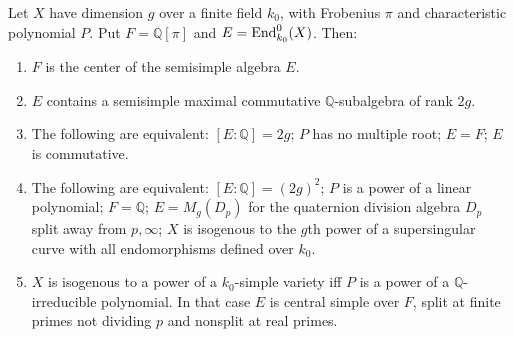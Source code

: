 \begin{theorem}
\label{mumford-thm-endomorphism-algebra-finite-field}
Let $X$ have dimension $g$ over a finite field $k_0$, with Frobenius $\pi$ and
characteristic polynomial $P$. Put $F=\mathbb Q[\pi]$ and
$E={\rm End}_{k_0}^{0}(X)$. Then:
\begin{enumerate}
\item $F$ is the center of the semisimple algebra $E$.
\item $E$ contains a semisimple maximal commutative $\mathbb Q$-subalgebra
of rank $2g$.
\item The following are equivalent: $[E:\mathbb Q]=2g$; $P$ has no multiple
root; $E=F$; $E$ is commutative.
\item The following are equivalent: $[E:\mathbb Q]=(2g)^2$; $P$ is a power
of a linear polynomial; $F=\mathbb Q$; $E=M_g(D_p)$ for the quaternion division
algebra $D_p$ split away from $p,\infty$; $X$ is isogenous to the $g$th power
of a supersingular curve with all endomorphisms defined over $k_0$.
\item $X$ is isogenous to a power of a $k_0$-simple variety iff $P$ is a power
of a $\mathbb Q$-irreducible polynomial. In that case $E$ is central simple over
$F$, split at finite primes not dividing $p$ and nonsplit at real primes.
\end{enumerate}
\end{theorem}
